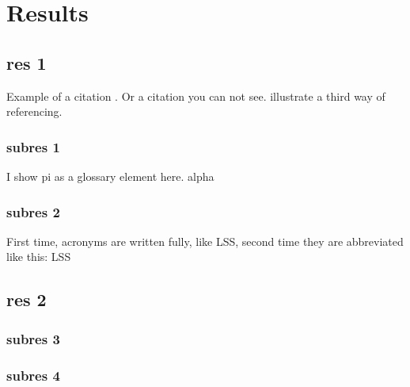 \chapter{Results}
\section{res 1}

Example of a citation \citep{Vapnik1995,Broeckx2018}. Or a citation you can not see\nocite{Stanley2017}. \cite{Reichenbach2018} illustrate a third way of referencing.
\subsection{subres 1}
I show \gls{pi} as a glossary element here. \gls{alpha}
\subsection{subres 2}
First time, acronyms are written fully, like \gls{LSS}, second time they are abbreviated like this: \gls{LSS}
\section{res 2}
\subsection{subres 3}
\subsection{subres 4}